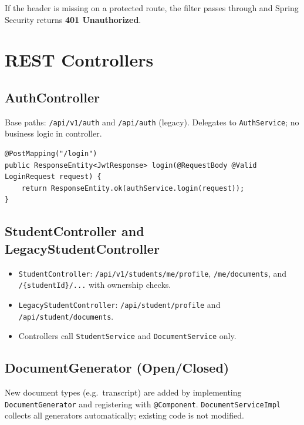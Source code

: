 \documentclass[11pt,a4paper]{article}
\begin{document}
If the header is missing on a protected route, the filter passes through and Spring Security returns \textbf{401 Unauthorized}.

\section{REST Controllers}

\subsection{AuthController}

Base paths: \texttt{/api/v1/auth} and \texttt{/api/auth} (legacy). Delegates to \texttt{AuthService}; no business logic in controller.

\begin{lstlisting}[style=javacode, caption={Login endpoint (excerpt)}]
@PostMapping("/login")
public ResponseEntity<JwtResponse> login(@RequestBody @Valid LoginRequest request) {
    return ResponseEntity.ok(authService.login(request));
}
\end{lstlisting}

\subsection{StudentController and LegacyStudentController}

\begin{itemize}[noitemsep]
    \item \texttt{StudentController}: \texttt{/api/v1/students/me/profile}, \texttt{/me/documents}, and \texttt{/\{studentId\}/...} with ownership checks.
    \item \texttt{LegacyStudentController}: \texttt{/api/student/profile} and \texttt{/api/student/documents}.
    \item Controllers call \texttt{StudentService} and \texttt{DocumentService} only.
\end{itemize}

\subsection{DocumentGenerator (Open/Closed)}

New document types (e.g.\ transcript) are added by implementing \texttt{DocumentGenerator} and registering with \texttt{@Component}. \texttt{DocumentServiceImpl} collects all generators automatically; existing code is not modified.
\end{document}
